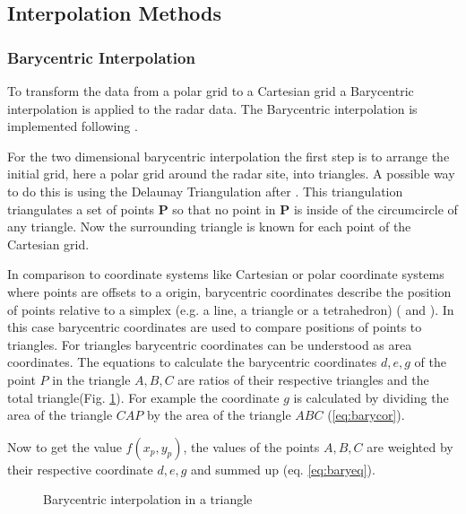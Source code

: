 \documentclass[11pt,twoside,a4paper,fleqn]{report}
\numberwithin{equation}{chapter}
\numberwithin{figure}{chapter}
\numberwithin{table}{chapter}
\begin{document}
\subsection{Interpolation Methods}
\subsubsection{Barycentric Interpolation}
To transform the data from a polar grid to a Cartesian grid a Barycentric interpolation is applied to the radar data. The Barycentric interpolation is implemented following \cite{bary}. 

For the two dimensional barycentric interpolation the first step is to arrange the initial grid, here a polar grid around the radar site, into triangles. A possible way to do this is using the Delaunay Triangulation after \cite{delaunay}. This triangulation triangulates a set of points \textbf{P} so that no point in \textbf{P} is inside of the circumcircle of any triangle. Now the surrounding triangle is known for each point of the Cartesian grid.

In comparison to coordinate systems like Cartesian or polar coordinate systems where points are offsets to a origin, barycentric coordinates describe the position of points relative to a simplex (e.g. a line, a triangle or a tetrahedron) (\citealp{bary} and \citealp{baryBerrut}). In this case barycentric coordinates are used to compare positions of points to triangles. For triangles barycentric coordinates can be understood as area coordinates. The equations to calculate the barycentric coordinates $d,e,g$ of the point $P$ in the triangle $A,B,C$ are ratios of their respective triangles and the total triangle(Fig. \ref{fig:bary}). For example the coordinate $g$ is calculated by dividing the area of the triangle $CAP$ by the area of the triangle $ABC$ (\ref{eq:barycor}).

Now to get the value $f(x_p,y_p)$, the values of the points $A,B,C$ are weighted by their respective coordinate $d,e,g$ and summed up (eq. \ref{eq:baryeq}).
\begin{figure}
	\centering
	\caption{Barycentric interpolation in a triangle}
	\label{fig:bary}
\end{figure}
\end{document}
